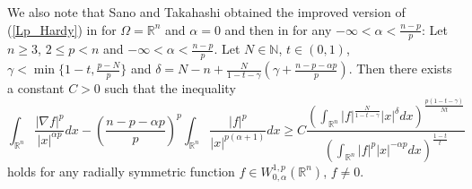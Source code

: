 \documentclass[a4paper,12pt,reqno]{amsart}
\renewcommand\eqref[1]{(\ref{#1})} %
\numberwithin{equation}{section}
\theoremstyle{plain}
\theoremstyle{definition}
\newcommand{\Rn}{\mathbb R^{n}}
\begin{document}
We also note that Sano and Takahashi obtained the improved version of \eqref{Lp_Hardy} in \cite{ST15a} for $\Omega=\Rn$ and $\alpha=0$ and then in \cite{ST15b} for any $-\infty<\alpha<\frac{n-p}{p}$:
Let $n\geq 3$, $2\leq p<n$ and $-\infty<\alpha<\frac{n-p}{p}$. Let $N\in \mathbb{N}$, $t\in (0,1)$, $\gamma<\min\{1-t, \frac{p-N}{p}\}$ and  $\delta=N-n+\frac{N}{1-t-\gamma}\left(\gamma+\frac{n-p-\alpha p}{p}\right)$.
Then there exists a constant $C>0$ such that the inequality
$$\int_{\Rn}\frac{|\nabla f|^{p}}{|x|^{\alpha p}}dx-\left(\frac{n-p-\alpha p}{p}\right)^{p}\int_{\Rn}\frac{|f|^{p}}{|x|^{p(\alpha+1)}}dx
\geq C\frac{\left(\int_{\Rn}|f|^{\frac{N}{1-t-\gamma}}|x|^{\delta}dx\right)^{\frac{p(1-t-\gamma)}{Nt}}}
{\left(\int_{\Rn}|f|^{p}|x|^{-\alpha p}dx\right)^{\frac{1-t}{t}}}
$$
holds for any radially symmetric function $f\in W_{0,\alpha}^{1,p}(\mathbb{R}^{n})$, $f\neq 0$.
\end{document}
